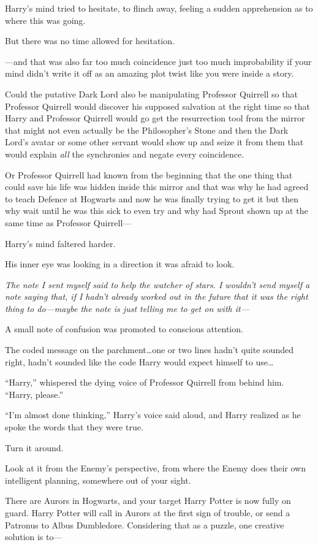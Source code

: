 Harry’s mind tried to hesitate, to flinch away, feeling a sudden apprehension as to where this was going.

But there was no time allowed for hesitation.

—and that was also far too much coincidence just too much improbability if your mind didn’t write it off as an amazing plot twist like you were inside a story.

Could the putative Dark Lord also be manipulating Professor Quirrell so that Professor Quirrell would discover his supposed salvation at the right time so that Harry and Professor Quirrell would go get the resurrection tool from the mirror that might not even actually be the Philosopher’s Stone and then the Dark Lord’s avatar or some other servant would show up and seize it from them that would explain \emph{all} the synchronies and negate every coincidence.

Or Professor Quirrell had known from the beginning that the one thing that could save his life was hidden inside this mirror and that was why he had agreed to teach Defence at Hogwarts and now he was finally trying to get it but then why wait until he was this sick to even try and why had Sprout shown up at the same time as Professor Quirrell—

Harry’s mind faltered harder.

His inner eye was looking in a direction it was afraid to look.

\emph{The note I sent myself said to help the watcher of stars. I wouldn’t send myself a note saying that, if I hadn’t already worked out in the future that it was the right thing to do—maybe the note is just telling me to get on with it—}

A small note of confusion was promoted to conscious attention.

The coded message on the parchment…one or two lines hadn’t quite sounded right, hadn’t sounded like the code Harry would expect himself to use…

“Harry,” whispered the dying voice of Professor Quirrell from behind him.
“Harry, please.”

“I’m almost done thinking,” Harry’s voice said aloud, and Harry realized as he spoke the words that they were true.

Turn it around.

Look at it from the Enemy’s perspective, from where the Enemy does their own intelligent planning, somewhere out of your sight.

There are Aurors in Hogwarts, and your target Harry Potter is now fully on guard. Harry Potter will call in Aurors at the first sign of trouble, or send a Patronus to Albus Dumbledore. Considering that as a puzzle, one creative solution is to—

